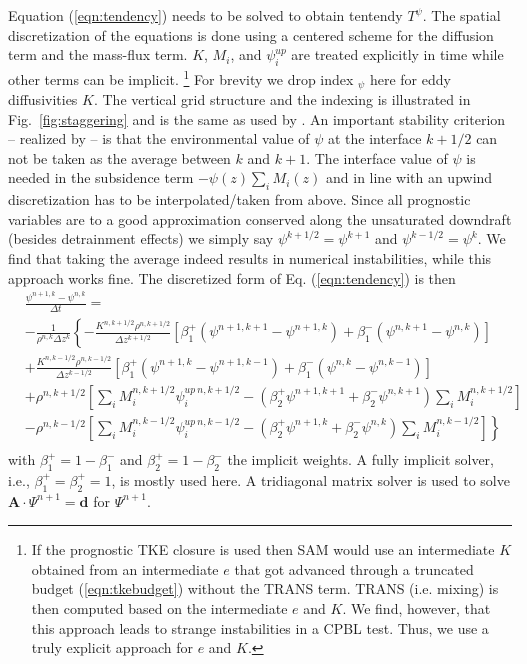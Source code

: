 \documentclass[dvipdfmx,a4paper,10pt]{article}
\begin{document}
Equation (\ref{eqn:tendency}) needs to be solved to obtain tentendy $T^{\psi}$. The spatial discretization of the equations is done using a centered scheme for the diffusion term and the mass-flux term. $K$, $M_i$, and $\psi^{up}_i$ are treated explicitly in time while other terms can be implicit. \footnote{{\color{blue} If the prognostic TKE closure is used then SAM would use an intermediate $K$ obtained from an intermediate $e$ that got advanced through a truncated budget (\ref{eqn:tkebudget}) without the TRANS term. TRANS (i.e. mixing) is then computed based on the intermediate $e$ and $K$. We find, however, that this approach leads to strange instabilities in a CPBL test. Thus, we use a truly explicit approach for $e$ and $K$.}} For brevity we drop index $_\psi$ here for eddy diffusivities $K$. The vertical grid structure and the indexing is illustrated in Fig.~\ref{fig:staggering} and is the same as used by \cite{tiedtke89}. An important stability criterion -- realized by \cite{tiedtke89} -- is that the environmental value of $\psi$ at the interface $k+1/2$ can not be taken as the average between $k$ and $k+1$. The interface value of $\psi$ is needed in the subsidence term $- \psi(z) \sum_i M_i(z)$ and in line with an upwind discretization has to be interpolated/taken from above. Since all prognostic variables are to a good approximation conserved along the unsaturated downdraft (besides detrainment effects) we simply say $\psi^{k+1/2}=\psi^{k+1}$ and  $\psi^{k-1/2}=\psi^{k}$. We find that taking the average indeed results in numerical instabilities, while this approach works fine. The discretized form of Eq. (\ref{eqn:tendency}) is then
\begin{align*}
  &\frac{\psi^{n+1,k}- \psi^{n,k} }{\Delta t} =\\
  &-\frac{1}{\rho^{n,k}\Delta z^{k}}\left\{ -\frac{K^{n,k+1/2}\rho^{n,k+1/2} }{\Delta z^{k+1/2}} [\beta_1^+(\psi^{n+1,k+1}-\psi^{n+1,k}) + \beta_1^-(\psi^{n,k+1}-\psi^{n,k})] \right. \\
    & \left.+\frac{K^{n,k-1/2}\rho^{n,k-1/2} }{\Delta z^{k-1/2}} [\beta_1^+(\psi^{n+1,k}-\psi^{n+1,k-1}) + \beta_1^-(\psi^{n,k}-\psi^{n,k-1})] \right.\\
    & \left. +\rho^{n,k+1/2}\left[\sum_i M_i^{n,k+1/2}\psi_i^{up~n,k+1/2} - (\beta_2^+\psi^{n+1,k+1}+\beta_2^-\psi^{n,k+1} )\sum_i M_i^{n,k+1/2} \right]\right.\\
    &\left.-\rho^{n,k-1/2}\left[\sum_i M_i^{n,k-1/2}\psi_i^{up~n,k-1/2} -(\beta_2^+\psi^{n+1,k}+\beta_2^-\psi^{n,k} )\sum_i M_i^{n,k-1/2} \right] \right\}\\
\end{align*}
with $\beta_1^+=1-\beta_1^-$ and $\beta_2^+=1-\beta_2^-$ the implicit weights. A fully implicit solver, i.e., $\beta_1^{+}=\beta_2^{+}=1$, is mostly used here. A tridiagonal matrix solver is used to solve $\mathbf{A}\cdot\Psi^{n+1}=\mathbf{d}$ for $\Psi^{n+1}$. 
\end{document}
